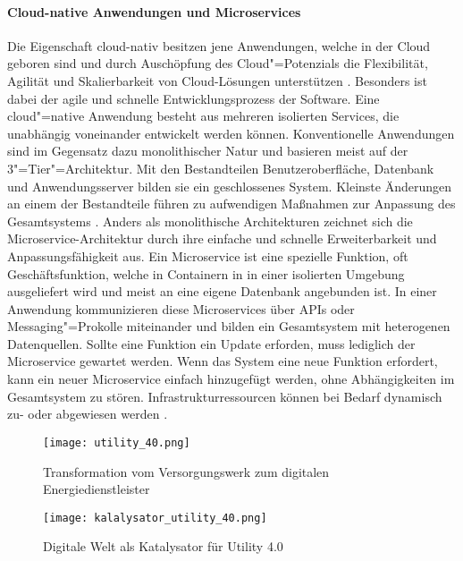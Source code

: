 \paragraph{Cloud-native Anwendungen und Microservices}

Die Eigenschaft cloud-nativ besitzen jene Anwendungen, welche in der Cloud \glqq geboren\grqq{} sind und durch Auschöpfung des Cloud"=Potenzials die Flexibilität, Agilität und Skalierbarkeit von Cloud-Lösungen unterstützen \citep{Acharya2019}. Besonders ist dabei der agile und schnelle Entwicklungsprozess der Software. Eine cloud"=native Anwendung besteht aus mehreren isolierten Services, die unabhängig voneinander entwickelt werden können. Konventionelle Anwendungen sind im Gegensatz dazu monolithischer Natur und basieren meist auf der 3"=Tier"=Architektur. Mit den Bestandteilen Benutzeroberfläche, Datenbank und Anwendungsserver bilden sie ein geschlossenes System. Kleinste Änderungen an einem der Bestandteile führen zu aufwendigen Maßnahmen zur Anpassung des Gesamtsystems \citep{Utecht2018}.
Anders als monolithische Architekturen zeichnet sich die Microservice-Architektur durch ihre einfache und schnelle Erweiterbarkeit und Anpassungsfähigkeit aus. Ein Microservice ist eine spezielle Funktion, oft Geschäftsfunktion, welche in Containern in in einer isolierten Umgebung ausgeliefert wird und meist an eine eigene Datenbank angebunden ist. In einer Anwendung kommunizieren diese Microservices über APIs oder Messaging"=Prokolle miteinander und bilden ein Gesamtsystem mit heterogenen Datenquellen. Sollte eine Funktion ein Update erforden, muss lediglich der Microservice  gewartet werden. Wenn das System eine neue Funktion erfordert, kann ein neuer Microservice einfach hinzugefügt werden, ohne Abhängigkeiten im Gesamtsystem zu stören. Infrastrukturressourcen können bei Bedarf dynamisch zu- oder abgewiesen werden \citep{Acharya2019}.


\begin{figure}[h]
  \texttt{[image: utility\_40.png]}
  \caption[Transformation vom Versorgungswerk zum digitalen Energiedienstleister]{Transformation vom Versorgungswerk zum digitalen Energiedienstleister \citep[S. 13]{Doleski2016}}
\end{figure}

\begin{figure}[h]
  \texttt{[image: kalalysator\_utility\_40.png]}
  \caption[Digitale Welt als Katalysator für Utility 4.0 ]{Digitale Welt als Katalysator für Utility 4.0 \citep[S. 17]{Doleski2016}}
\end{figure}
